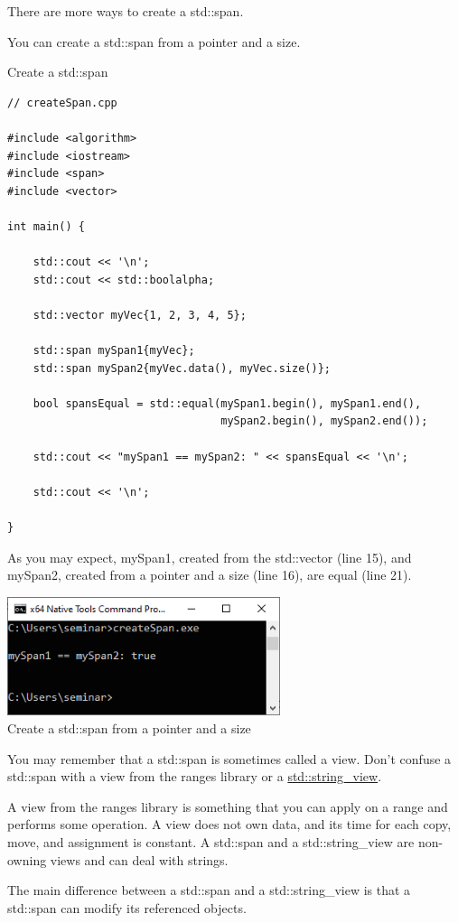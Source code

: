 There are more ways to create a std::span.



You can create a std::span from a pointer and a size.

\noindent
Create a std::span
\begin{lstlisting}[style=styleCXX]
// createSpan.cpp

#include <algorithm>
#include <iostream>
#include <span>
#include <vector>

int main() {
	
	std::cout << '\n';
	std::cout << std::boolalpha;
	
	std::vector myVec{1, 2, 3, 4, 5};
	
	std::span mySpan1{myVec};
	std::span mySpan2{myVec.data(), myVec.size()};
	
	bool spansEqual = std::equal(mySpan1.begin(), mySpan1.end(),
	                             mySpan2.begin(), mySpan2.end());
	
	std::cout << "mySpan1 == mySpan2: " << spansEqual << '\n';
	
	std::cout << '\n';

}
\end{lstlisting}

As you may expect, mySpan1, created from the std::vector (line 15), and mySpan2, created from a pointer and a size (line 16), are equal (line 21).

\begin{center}
\includegraphics[width=0.6\textwidth]{content/3/chapter5/images/6.png}\\
Create a std::span from a pointer and a size
\end{center}

\begin{tcolorbox}[colback=red!5!white,colframe=red!75!black,title={A std::span is neither a std::string\_view nor a view}]
You may remember that a std::span is sometimes called a view. Don’t confuse a std::span with a view from the ranges library or a \href{https://www.modernescpp.com/index.php/c-17-what-s-new-in-the-library}{std::string\_view}.

A view from the ranges library is something that you can apply on a range and performs some operation. A view does not own data, and its time for each copy, move, and assignment is constant. A std::span and a std::string\_view are non-owning views and can deal with strings.

The main difference between a std::span and a std::string\_view is that a std::span can modify its referenced objects.
\end{tcolorbox}
	
